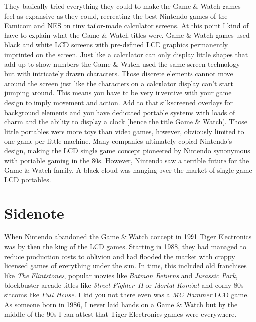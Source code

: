 \documentclass{book}
\begin{document}
They basically tried everything they could to make the Game \& Watch games feel as expansive as they could, recreating the best Nintendo games of the Famicom and NES on tiny tailor-made calculator screens. At this point I kind of have to explain what the Game \& Watch titles were. Game \& Watch games used black and white LCD screens with pre-defined LCD graphics permanently imprinted on the screen. Just like a calculator can only display little shapes that add up to show numbers the Game \& Watch used the same screen technology but with intricately drawn characters. Those discrete elements cannot move around the screen just like the characters on a calculator display can’t start jumping around. This means you have to be very inventive with your game design to imply movement and action. Add to that silkscreened overlays for background elements and you have dedicated portable systems with loads of charm and the ability to display a clock (hence the title Game \& Watch). Those little portables were more toys than video games, however, obviously limited to one game per little machine. Many companies ultimately copied Nintendo’s design, making the LCD single game concept pioneered by Nintendo synonymous with portable gaming in the 80s. However, Nintendo saw a terrible future for the Game \& Watch family. A black cloud was hanging over the market of single-game LCD portables.\par
\FloatBarrier\vspace{\baselineskip}\begin{figure}[H]\end{figure}
\FloatBarrier\section*{Sidenote}
When Nintendo abandoned the Game \& Watch concept in 1991 Tiger Electronics was by then the king of the LCD games. Starting in 1988, they had managed to reduce production costs to oblivion and had flooded the market with crappy licensed games of everything under the sun. In time, this included old franchises like \emph{The Flintstones}, popular movies like \emph{Batman Returns} and \emph{Jurassic Park}, blockbuster arcade titles like \emph{Street Fighter~II} or \emph{Mortal Kombat} and corny 80s sitcoms like \emph{Full House}. I kid you not there even was a \emph{MC Hammer} LCD game. As someone born in 1986, I never laid hands on a Game \& Watch but by the middle of the 90s I can attest that Tiger Electronics games were everywhere.\par
\end{document}
